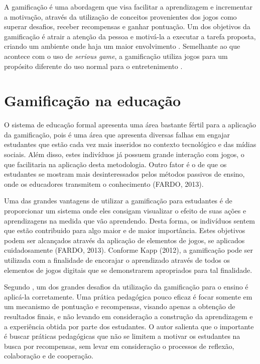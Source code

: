 \documentclass[
	12pt,				%
	oneside,			%
	a4paper,			%
	english,			%
	french,				%
	spanish,			%
	brazil,				%
	]{abntex2}
\begin{document}
A gamificação é uma abordagem que visa facilitar a aprendizagem e incrementar a motivação, através da utilização de conceitos provenientes dos jogos como superar desafios, receber recompensas e ganhar pontuação. Um dos objetivos da gamificação é atrair a atenção da pessoa e motivá-la a executar a tarefa proposta, criando um ambiente onde haja um maior envolvimento \cite{kaap:2014}. Semelhante ao que acontece com o uso de \textit{serious game}, a gamificação utiliza jogos para um propósito diferente do uso normal para o entretenimento \cite{deterding2011game}.

\section{Gamificação na educação}

O sistema de educação formal apresenta uma área bastante fértil para a aplicação da gamificação, pois é uma área que apresenta diversas falhas em engajar estudantes que estão cada vez mais inseridos no contexto tecnológico e das mídias sociais. Além disso, estes indivíduos já possuem grande interação com jogos, o que facilitaria na aplicação desta metodologia. Outro fator é o de que os estudantes se mostram mais desinteressados pelos métodos passivos de ensino, onde os educadores transmitem o conhecimento (FARDO, 2013). 

Uma das grandes vantagens de utilizar a gamificação para estudantes é de proporcionar um sistema onde eles consigam visualizar o efeito de suas ações e aprendizagens na medida que vão aprendendo. Desta forma, os indivíduos sentem que estão contribuido para algo maior e de maior importância. Estes objetivos podem ser alcançados através da aplicação de elementos de jogos, se aplicados cuidadosamente (FARDO, 2013). Conforme Kapp (2012), a gamificação pode ser utilizada com a finalidade de encorajar o aprendizado através de todos os elementos de jogos digitais que se demonstrarem apropriados para tal finalidade.  

Segundo \citet{fardo2013gamificaccao}, um dos grandes desafios da utilização da gamificação para o ensino é aplicá-la corretamente. Uma prática pedagógica pouco eficaz é focar somente em um mecanismo de pontuação e recompensas, visando apenas a obtenção de resultados finais, e não levando em consideração a construção da aprendizagem e a experiência obtida por parte dos estudantes. O autor salienta que o importante é buscar práticas pedagógicas que não se limitem a motivar os estudantes na busca por recompensas, sem levar em consideração o processos de reflexão, colaboração e de cooperação.
\end{document}
